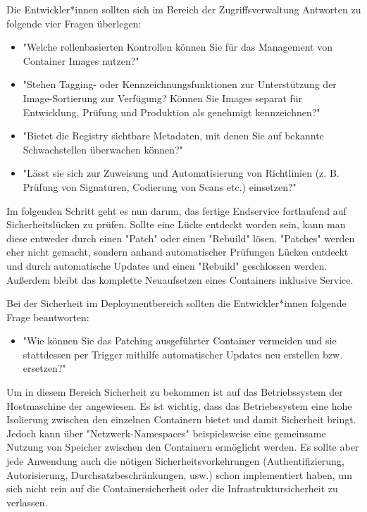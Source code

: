 Die Entwickler*innen sollten sich im Bereich der Zugriffsverwaltung Antworten zu folgende vier Fragen überlegen:

\begin{itemize}
    \item "Welche rollenbasierten Kontrollen können Sie für das Management von Container Images nutzen?" \cite{ContainerSecurity}
    \item "Stehen Tagging- oder Kennzeichnungsfunktionen zur Unterstützung der Image-Sortierung zur Verfügung? Können Sie Images separat für Entwicklung, Prüfung und Produktion als genehmigt kennzeichnen?" \cite{ContainerSecurity}
    \item "Bietet die Registry sichtbare Metadaten, mit denen Sie auf bekannte Schwachstellen überwachen können?" \cite{ContainerSecurity}
    \item "Lässt sie sich zur Zuweisung und Automatisierung von Richtlinien (z. B. Prüfung von Signaturen, Codierung von Scans etc.) einsetzen?" \cite{ContainerSecurity}
\end{itemize}


Im folgenden Schritt geht es nun darum, das fertige Endservice fortlaufend auf Sicherheitslücken zu prüfen. Sollte eine Lücke entdeckt worden sein, kann man diese entweder durch einen "Patch" oder einen "Rebuild" lösen. "Patches" werden eher nicht gemacht, sondern anhand automatischer Prüfungen Lücken entdeckt und durch automatische Updates und einen "Rebuild" geschlossen werden. Außerdem bleibt das komplette Neuaufsetzen eines Containers inklusive Service. \cite{ContainerSecurity}

Bei der Sicherheit im Deploymentbereich sollten die Entwickler*innen folgende Frage beantworten:

\begin{itemize}
    \item "Wie können Sie das Patching ausgeführter Container vermeiden und sie stattdessen per Trigger mithilfe automatischer Updates neu erstellen bzw. ersetzen?" \cite{ContainerSecurity}
\end{itemize}

\cite{ContainerSecurity}


Um in diesem Bereich Sicherheit zu bekommen ist auf das Betriebssystem der Hostmaschine der angewiesen. Es ist wichtig, dass das Betriebssystem eine hohe Isolierung zwischen den einzelnen Containern bietet und damit Sicherheit bringt. Jedoch kann über "Netzwerk-Namespaces" beispielsweise eine gemeinsame Nutzung von Speicher zwischen den Containern ermöglicht werden. Es sollte aber jede Anwendung auch die nötigen Sicherheitsvorkehrungen (Authentifizierung, Autorisierung, Durchsatzbeschränkungen, usw.) schon implementiert haben, um sich nicht rein auf die Containersicherheit oder die Infrastruktursicherheit zu verlassen. \cite{ContainerSecurity}


